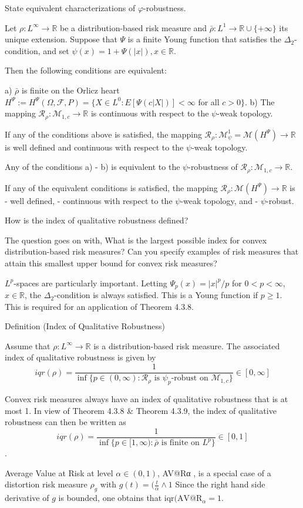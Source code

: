 State equivalent characterizations of \( \varphi \)-robustness.

Let \(\rho: L^{\infty} \rightarrow \mathbb{R}\) be a distribution-based risk measure and 
\(\bar{\rho}: L^1 \rightarrow \mathbb{R} \cup \{+\infty\}\) its unique extension. 
Suppose that \(\Psi\) is a finite Young function that satisfies the \(\Delta_2\)-condition, and set 
\(\psi(x) = 1 + \Psi(|x|), x \in \mathbb{R}\).

Then the following conditions are equivalent:

a) \(\bar{\rho}\) is finite on the Orlicz heart \(H^{\Psi} := H^{\Psi}(\Omega, \mathcal{F}, P) = \{ X \in L^0 : E[\Psi(c|X|)] < \infty\) 
    for all \(c > 0 \}\).
b) The mapping \(\mathcal{R}_{\rho}: \mathcal{M}_{1,c} \rightarrow \mathbb{R}\) is continuous with respect to the \(\psi\)-weak topology.

If any of the conditions above is satisfied, the mapping 
\(\mathcal{R}_{\rho}: \mathcal{M}_{\psi}^1 = \mathcal{M}(H^{\Psi}) \rightarrow \mathbb{R}\) 
is well defined and continuous with respect to the \(\psi\)-weak topology.

Any of the conditions a) - b) is equivalent to the \(\psi\)-robustness of \(\mathcal{R}_{\rho}: \mathcal{M}_{1,c} \rightarrow \mathbb{R}\).

If any of the equivalent conditions is satisfied, the mapping \(\mathcal{R}_{\rho}: \mathcal{M}(H^{\Psi}) \rightarrow \mathbb{R}\) is
- well defined,
- continuous with respect to the \(\psi\)-weak topology, and
- \(\psi\)-robust.


How is the index of qualitative robustness defined?

The question goes on with, What is the largest possible
index for convex distribution-based risk measures? Can you specify examples of
risk measures that attain this smallest upper bound for convex risk measures?

\(L^p\)-spaces are particularly important. 
Letting \(\Psi_p(x) = |x|^p/p\) for \(0 < p < \infty\), \(x \in \mathbb{R}\), the \(\Delta_2\)-condition is always satisfied. 
This is a Young function if \(p \geq 1\). This is required for an application of Theorem 4.3.8.

Definition (Index of Qualitative Robustness)

Assume that \(\rho: L^{\infty} \rightarrow \mathbb{R}\) is a distribution-based risk measure. 
The associated index of qualitative robustness is given by
\[iqr(\rho) = \frac{1}{\inf \{ p \in (0, \infty) : \mathcal{R}_{\rho} \text{ is } \psi_p\text{-robust on } \mathcal{M}_{1,c} \}} \in [0, \infty]\]

Convex risk measures always have an index of qualitative robustness that is at most 1. 
In view of Theorem 4.3.8 & Theorem 4.3.9, the index of qualitative robustness can then be written as
\[iqr(\rho) = \frac{1}{\inf \{ p \in [1, \infty) : \bar{\rho} \text{ is finite on } L^p \}} \in [0, 1]\].

Average Value at Risk at level \( α ∈ (0, 1) \), AV@Rα , is a special case of a distortion risk measure \( \rho_g \) with
\( g(t) = (\frac{t}{\alpha} \wedge 1 \)
Since the right hand side derivative of \( g \) is bounded, one obtains that \( \text{iqr}(\text{AV@R}_{\alpha} = 1\).
